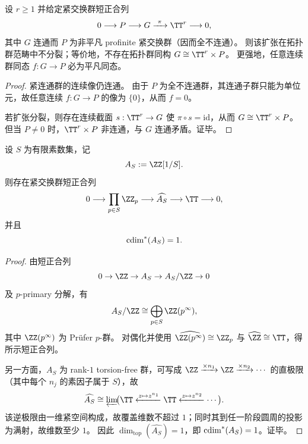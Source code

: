 \begin{theorem}\label{thm:cdim-connected-phase-profinite-fiber-indecomposable}
设 \(r\ge 1\) 并给定紧交换群短正合列
\[
0\longrightarrow P\longrightarrow G\xrightarrow{\ \pi\ }\TT^r\longrightarrow 0,
\]
其中 \(G\) 连通而 \(P\) 为非平凡 profinite 紧交换群（因而全不连通）。
则该扩张在拓扑群范畴中不分裂；等价地，不存在拓扑群同构 \(G\cong \TT^r\times P\)。
更强地，任意连续群同态 \(f:G\to P\) 必为平凡同态。
\end{theorem}
\begin{proof}
紧连通群的连续像仍连通。
由于 \(P\) 为全不连通群，其连通子群只能为单位元，故任意连续 \(f:G\to P\) 的像为 \(\{0\}\)，从而 \(f=0\)。
\par
若扩张分裂，则存在连续截面 \(s:\TT^r\to G\) 使 \(\pi\circ s=\mathrm{id}\)，从而 \(G\cong \TT^r\times P\)。
但当 \(P\neq 0\) 时，\(\TT^r\times P\) 非连通，与 \(G\) 连通矛盾。证毕。
\end{proof}

\begin{theorem}\label{thm:cdim-star-z1s-dual-extension}
设 \(S\) 为有限素数集，记
\[
A_S:=\ZZ[1/S].
\]
则存在紧交换群短正合列
\[
0\longrightarrow \prod_{p\in S}\ZZ_p
\longrightarrow \widehat{A_S}
\longrightarrow \TT
\longrightarrow 0,
\]
并且
\[
\operatorname{cdim}^\ast(A_S)=1.
\]
\end{theorem}
\begin{proof}
由短正合列
\[
0\to \ZZ\to A_S\to A_S/\ZZ\to 0
\]
及 \(p\)-primary 分解，有
\[
A_S/\ZZ\cong \bigoplus_{p\in S}\ZZ(p^\infty),
\]
其中 \(\ZZ(p^\infty)\) 为 Prüfer \(p\)-群。
对偶化并使用
\(
\widehat{\ZZ(p^\infty)}\cong \ZZ_p
\)
与 \(\widehat{\ZZ}\cong\TT\)，得所示短正合列。

另一方面，\(A_S\) 为 rank-\(1\) torsion-free 群，可写成 \(\ZZ\xrightarrow{\times n_1}\ZZ\xrightarrow{\times n_2}\cdots\) 的直极限（其中每个 \(n_j\) 的素因子属于 \(S\)），故
\[
\widehat{A_S}\cong \varprojlim\!\bigl(\TT\xleftarrow{z\mapsto z^{n_1}}\TT\xleftarrow{z\mapsto z^{n_2}}\cdots\bigr).
\]
该逆极限由一维紧空间构成，故覆盖维数不超过 \(1\)；同时其到任一阶段圆周的投影为满射，故维数至少 \(1\)。
因此 \(\dim_{\mathrm{top}}(\widehat{A_S})=1\)，即 \(\operatorname{cdim}^\ast(A_S)=1\)。证毕。
\end{proof}

